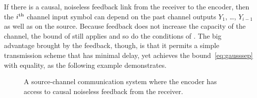 If there is a causal, noiseless feedback link from the receiver to the encoder,
then the $i{^{\text{th}}}$ channel input symbol can depend on the past channel outputs
$Y_1$, \dots, $Y_{i-1}$ as well as on the source. Because feedback does not
increase the capacity of the channel, the bound of 
still applies and so do the conditions of . The big
advantage brought by the feedback, though, is that it permits a simple
transmission scheme that has minimal delay, yet achieves the
bound~\eqref{eq:gausssep} with equality, as the following example demonstrates.

\begin{figure}
  \begin{center}
    
  \end{center}
  \caption{A source-channel communication system where the encoder has access to
  causal noiseless feedback from the receiver.}
  \label{fig:scgenfeedback}
\end{figure}

